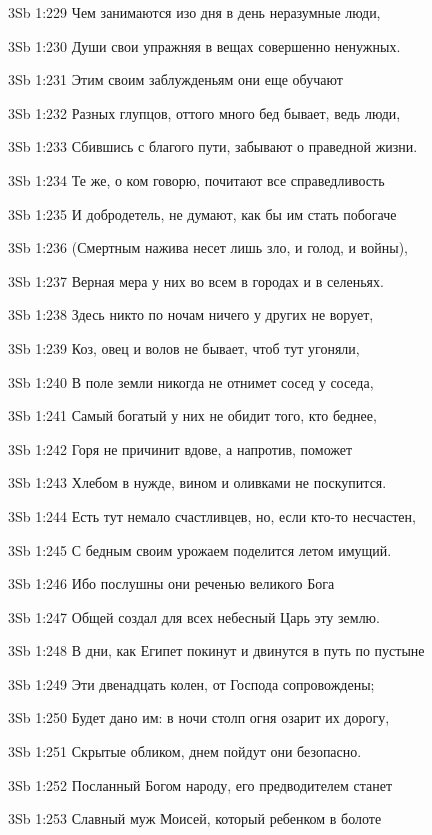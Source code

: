 \vs 3Sb 1:229 Чем занимаются изо дня в день неразумные люди,

\vs 3Sb 1:230 Души свои упражняя в вещах совершенно ненужных. 

\vs 3Sb 1:231 Этим своим заблужденьям они еще обучают 

\vs 3Sb 1:232 Разных глупцов, оттого много бед бывает, ведь люди, 

\vs 3Sb 1:233 Сбившись с благого пути, забывают о праведной жизни. 

\vs 3Sb 1:234 Те же, о ком говорю, почитают все справедливость

\vs 3Sb 1:235 И добродетель, не думают, как бы им стать побогаче 

\vs 3Sb 1:236 (Смертным нажива несет лишь зло, и голод, и войны), 

\vs 3Sb 1:237 Верная мера у них во всем в городах и в селеньях. 

\vs 3Sb 1:238 Здесь никто по ночам ничего у других не ворует, 

\vs 3Sb 1:239 Коз, овец и волов не бывает, чтоб тут угоняли,

\vs 3Sb 1:240 В поле земли никогда не отнимет сосед у соседа, 

\vs 3Sb 1:241 Самый богатый у них не обидит того, кто беднее, 

\vs 3Sb 1:242 Горя не причинит вдове, а напротив, поможет 

\vs 3Sb 1:243 Хлебом в нужде, вином и оливками  не поскупится. 

\vs 3Sb 1:244 Есть тут немало счастливцев, но, если кто-то несчастен,

\vs 3Sb 1:245 С бедным своим урожаем поделится летом имущий. 

\vs 3Sb 1:246 Ибо послушны они реченью великого Бога  

\vs 3Sb 1:247 Общей создал для всех небесный Царь эту землю.

\vs 3Sb 1:248 В дни, как Египет покинут и двинутся в путь по пустыне 

\vs 3Sb 1:249 Эти двенадцать колен, от Господа сопровождены;

\vs 3Sb 1:250 Будет дано им: в ночи столп огня озарит их дорогу, 

\vs 3Sb 1:251 Скрытые обликом, днем пойдут они безопасно. 

\vs 3Sb 1:252 Посланный Богом народу, его предводителем станет 

\vs 3Sb 1:253 Славный муж Моисей, который ребенком в болоте 

